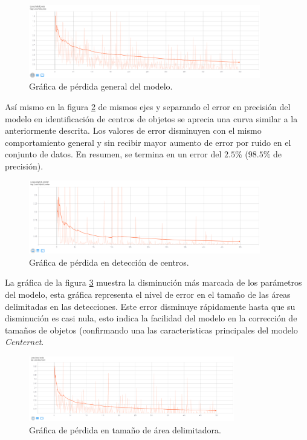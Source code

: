 \documentclass[letter,12pt]{report}
\begin{document}
\begin{figure}[ht]
    \centering
    \includegraphics[width=0.9\textwidth]{total_loss}
    \caption{Gráfica de pérdida general del modelo.}
    \label{fig:total_loss}
\end{figure}

Así mismo en la figura \ref{fig:object_center} de mismos ejes y separando el error en
precisión del modelo en identificación de centros de objetos se aprecia una curva similar a
la anteriormente descrita. Los valores de error disminuyen con el mismo comportamiento
general y sin recibir mayor aumento de error por ruido en el conjunto de datos. En resumen,
se termina en un error del $2.5\%$ ($98.5\%$ de precisión).

\begin{figure}[ht]
    \centering
    \includegraphics[width=0.9\textwidth]{object_center}
    \caption{Gráfica de pérdida en detección de centros.}
    \label{fig:object_center}
\end{figure}

La gráfica de la figura \ref{fig:scale} muestra la disminución más marcada de los parámetros
del modelo, esta gráfica representa el nivel de error en el tamaño de las áreas delimitadas
en las detecciones. Este error disminuye rápidamente hasta que su disminución es casi nula,
esto indica la facilidad del modelo en la corrección de tamaños de objetos (confirmando una 
las caracteristicas principales del modelo \textit{Centernet}.

\begin{figure}[ht]
    \centering
    \includegraphics[width=0.8\textwidth]{scale}
    \caption{Gráfica de pérdida en tamaño de área delimitadora.}
    \label{fig:scale}
\end{figure}
\end{document}
